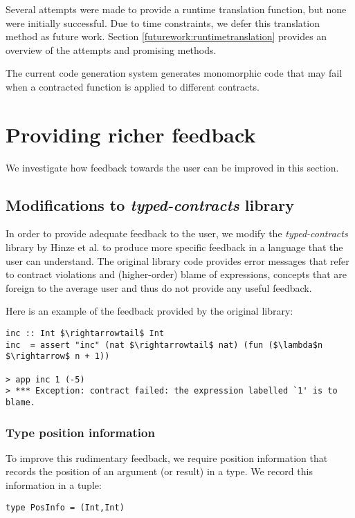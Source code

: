\documentclass[10pt]{report}
\begin{document}
{Several attempts were made to provide a runtime translation function, but none were initially successful.
Due to time constraints, we defer this translation method as future work.
Section \ref{futurework:runtimetranslation} provides an overview of the attempts and promising methods.

The current code generation system generates monomorphic code that may fail when a contracted function is applied to different contracts.

\section{Providing richer feedback}

We investigate how feedback towards the user can be improved in this section.

\subsection{Modifications to \textit{typed-contracts} library}
\label{modificationstotypedcontracts}
In order to provide adequate feedback to the user, we modify the \textit{typed-contracts} library by Hinze et al. \cite{Hinze06typedcontracts} to produce more specific feedback in a language that the user can understand.
The original library code provides error messages that refer to contract violations and (higher-order) blame of expressions, concepts that are foreign to the average user and thus do not provide any useful feedback.

Here is an example of the feedback provided by the original library:

\begin{lstlisting}[mathescape]
inc :: Int $\rightarrowtail$ Int
inc  = assert "inc" (nat $\rightarrowtail$ nat) (fun ($\lambda$n $\rightarrow$ n + 1))

> app inc 1 (-5)
> *** Exception: contract failed: the expression labelled `1' is to blame.
\end{lstlisting}

\subsubsection{Type position information}

To improve this rudimentary feedback, we require position information that records the position of an argument (or result) in a type.
We record this information in a tuple:

\begin{lstlisting}
type PosInfo = (Int,Int)
\end{lstlisting}

}
\end{document}
